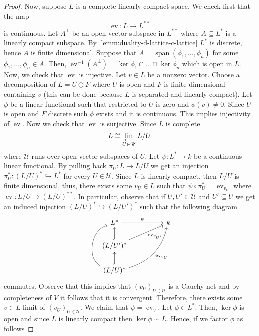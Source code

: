 \begin{proof}
	Now, suppose $L$ is a complete linearly compact space. We check first that the map 
	\[
		\operatorname{ev}\colon L \to L^{**}
	\]
	is continuous. Let $A^{\perp}$ be an open vector subspace in $L^{**}$ where $A \subseteq L^{*}$ is a linearly compact subspace. By \cref{lemm:duality-d-lattice-c-lattice} $L^{*}$ is discrete, hence $A$ is finite dimensional. Suppose that $A = \operatorname{span}(\phi_{1},\ldots,\phi_{n})$ for some $\phi_{1},\ldots,\phi_{n} \in A$. Then, $\operatorname{ev}^{-1}(A^{\perp}) = \ker \phi_{1} \cap \ldots \cap \ker \phi_{n}$ which is open in $L$. Now, we check that $\operatorname{ev}$ is injective. Let $v \in L$ be a nonzero vector. Choose a decomposition of $L = U \oplus F$ where $U$ is open and $F$ is finite dimensional containing $v$ (this can be done because $L$ is separated and linearly compact). Let $\phi$ be a linear functional such that restricted to $U$ is zero and $\phi(v) \neq 0$. Since $U$ is open and $F$ discrete such $\phi$ exists and it is continuous. This implies injectivity of $\operatorname{ev}$.  Now we check that $\operatorname{ev}$ is surjective. Since $L$ is complete 
	\[
		L \cong \varprojlim_{U \in \mathscr{U}} L/U
	\]
	where $\mathscr{U}$ runs over open vector subspaces of $U$. Let $\psi\colon L^{*} \to k$ be a continuous linear functional. By pulling back $\pi_{U}\colon L \to L/U$ we get an injection $\pi_{U}^{*}\colon(L/U)^{*} \hookrightarrow L^{*}$ for every $U \in \mathscr{U}$. Since $L$ is linearly compact, then $L/U$ is finite dimensional, thus, there exists some $v_{U}\in L$ such that $\psi \circ \pi_{U}^{*} = \operatorname{ev}_{v_{U}}$ where $\operatorname{ev}\colon L/U \to (L/U)^{**}$. In particular, observe that if $U,U' \in \mathscr{U}$ and $U' \subseteq U$ we get an induced injection $(L/U)^{*} \hookrightarrow (L/U')^{*}$ such that the following diagram
	\[
	\begin{tikzcd}
		L^{*} \arrow[rr, "\psi"] & & k \\
		(L/U')^{*} \arrow[u, hook] \arrow[urr, swap, "\operatorname{ev}_{v_{U'}}"] & & \\
		(L/U)^{*} \arrow[u, hook] \arrow[uurr, swap, bend right, "\operatorname{ev}_{v_{U}}"] \arrow[uu, bend left = 70, hook]& & 
	\end{tikzcd}
	\]
	commutes. Observe that this implies that $(v_{U})_{U\in \mathscr{U}}$ is a Cauchy net and by completeness of $V$ it follows that it is convergent. Therefore, there exists some $v \in L$ limit of $(v_{U})_{U\in \mathscr{U}}$. We claim that $\psi = \operatorname{ev}_{v}$. Let $\phi \in L^{*}$. Then, $\ker\phi$ is open and since $L$ is linearly compact then $\ker\phi \sim L$. Hence, if we factor $\phi$ as follows

\end{proof}
